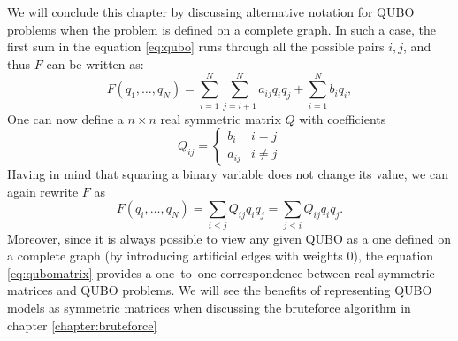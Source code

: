 We will conclude this chapter by discussing alternative notation for QUBO
problems when the problem is defined on a complete graph. In such a case, the
first sum in the equation \eqref{eq:qubo} runs through all the possible pairs
${i, j}$, and thus $F$ can be written as:
    \begin{equation}
      \label{eq:qubocomplete}
      F(q_1, \ldots, q_N) =  \sum_{i=1}^N \sum_{j=i+1}^N a_{ij} q_i q_j + \sum_{i=1}^N b_iq_i,
    \end{equation}
    One can now define a $n \times n$ real symmetric matrix $Q$ with coefficients
    \begin{equation}
      Q_{ij} = \begin{cases}
        b_{i}  & i = j   \\
        a_{ij} & i \ne j
      \end{cases}
    \end{equation}
    Having in mind that squaring a binary variable does not change its value, we
    can again rewrite $F$ as
\begin{equation}
  \label{eq:qubomatrix}
  F(q_{i}, \ldots, q_{N}) = \sum_{i \le j} Q_{ij} q_{i}q_{j} = \sum_{j \le i} Q_{ij} q_{i}q_{j}.
\end{equation}
Moreover, since it is always possible to view any given QUBO as a one defined
on a complete graph (by introducing artificial edges with weights 0), the
equation \eqref{eq:qubomatrix} provides a one--to--one correspondence between
real symmetric matrices and QUBO problems. We will see the benefits of
representing QUBO models as symmetric matrices when discussing the bruteforce
algorithm in chapter \ref{chapter:bruteforce}

